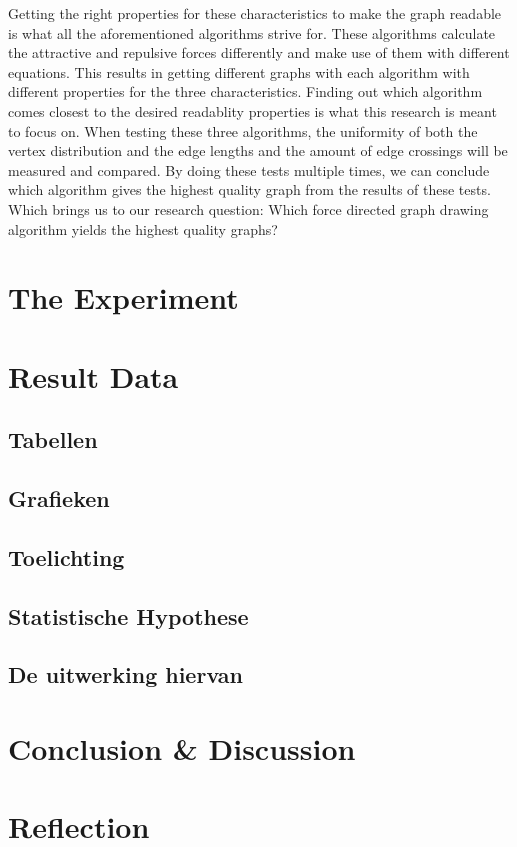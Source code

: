 \documentclass[a4paper,12pt]{article}
\begin{document}
    Getting the right properties for these characteristics to make the graph readable is what all the aforementioned algorithms strive for.
    These algorithms calculate the attractive and repulsive forces differently and make use of them with different equations.
    This results in getting different graphs with each algorithm with different properties for the three characteristics.
    Finding out which algorithm comes closest to the desired readablity properties is what this research is meant to focus on.
    When testing these three algorithms, the uniformity of both the vertex distribution and the edge lengths and the amount of edge crossings will be measured and compared.
    By doing these tests multiple times, we can conclude which algorithm gives the highest quality graph from the results of these tests.
    Which brings us to our research question: Which force directed graph drawing algorithm yields the highest quality graphs?

  \section{The Experiment} %

  \section{Result Data} %
  \subsection{Tabellen} %
  \subsection{Grafieken}
  \subsection{Toelichting}
  \subsection{Statistische Hypothese}
  \subsection{De uitwerking hiervan}

  \section{Conclusion \& Discussion}
  \section{Reflection}

  {}
  
\end{document}
